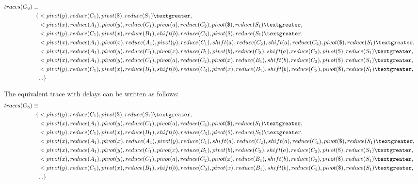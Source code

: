 \documentclass[11pt]{article}
\begin{document}
\begin{align*}
traces(G_8) \equiv \\
\{ & \textless pivot(y), reduce(C_1), pivot(\$), reduce(S_1) \textgreater,\\
                      & \textless pivot(x), reduce(A_1), pivot(y), reduce(C_1), pivot(a), reduce(C_2), pivot(\$), reduce(S_1) \textgreater,\\
                      & \textless pivot(y), reduce(C_1), pivot(x), reduce(B_1), shift(b), reduce(C_3), pivot(\$), reduce(S_1) \textgreater,\\
                      & \textless pivot(x), reduce(A_1), pivot(x), reduce(A_1), pivot(y), reduce(C_1), shift(a), reduce(C_2), shift(a), reduce(C_2), pivot(\$), reduce(S_1) \textgreater,\\
                      & \textless pivot(x), reduce(A_1), pivot(y), reduce(C_1), pivot(x), reduce(B_1), pivot(b), reduce(C_3), shift(a), reduce(C_2), pivot(\$), reduce(S_1) \textgreater,\\
                      & \textless pivot(x), reduce(A_1), pivot(y), reduce(C_1), pivot(a), reduce(C_2), pivot(x), reduce(B_1), shift(b), reduce(C_3), pivot(\$), reduce(S_1) \textgreater,\\
                      & \textless pivot(y), reduce(C_1), pivot(x), reduce(B_1), shift(b), reduce(C_3), pivot(x), reduce(B_1), shift(b), reduce(C_3), pivot(\$), reduce(S_1) \textgreater,\\
                      & ... \}
\end{align*}

The equivalent trace with delays can be written as follows:
\begin{align*}
traces(G_8) \equiv \\
\{ & \textless pivot(y), reduce(C_1), pivot(\$), reduce(S_1) \textgreater,\\
                      & \textless pivot(x), reduce(A_1), pivot(y), reduce(C_1), pivot(a), reduce(C_2), pivot(\$), reduce(S_1) \textgreater,\\
                      & \textless pivot(y), reduce(C_1), pivot(x), reduce(B_1), shift(b), reduce(C_3), pivot(\$), reduce(S_1) \textgreater,\\
                      & \textless pivot(x), reduce(A_1), pivot(x), reduce(A_1), pivot(y), reduce(C_1), shift(a), reduce(C_2), shift(a), reduce(C_2), pivot(\$), reduce(S_1) \textgreater,\\
                      & \textless pivot(x), reduce(A_1), pivot(y), reduce(C_1), pivot(x), reduce(B_1), pivot(b), reduce(C_3), shift(a), reduce(C_2), pivot(\$), reduce(S_1) \textgreater,\\
                      & \textless pivot(x), reduce(A_1), pivot(y), reduce(C_1), pivot(a), reduce(C_2), pivot(x), reduce(B_1), shift(b), reduce(C_3), pivot(\$), reduce(S_1) \textgreater,\\
                      & \textless pivot(y), reduce(C_1), pivot(x), reduce(B_1), shift(b), reduce(C_3), pivot(x), reduce(B_1), shift(b), reduce(C_3), pivot(\$), reduce(S_1) \textgreater,\\
                      & ... \}
\end{align*}
\end{document}
